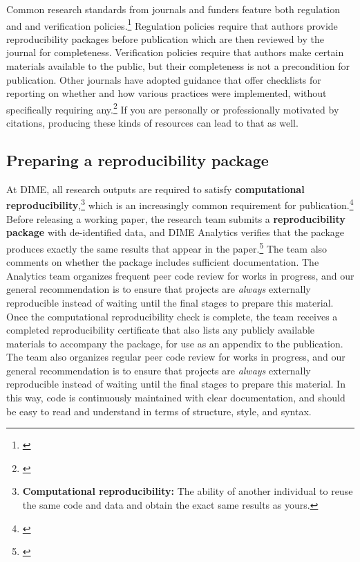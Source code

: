 \documentclass[]{tufte-book}
\begin{document}
Common research standards from journals and funders feature both
regulation and and verification policies.\footnote{\cite{@stodden2013toward}}
Regulation policies require that authors provide reproducibility
packages before publication which are then reviewed by the journal for
completeness. Verification policies require that authors make certain
materials available to the public, but their completeness is not a
precondition for publication. Other journals have adopted guidance that
offer checklists for reporting on whether and how various practices were
implemented, without specifically requiring any.\footnote{\cite{@nosek2015promoting}}
If you are personally or professionally motivated by citations,
producing these kinds of resources can lead to that as well.

\hypertarget{preparing-a-reproducibility-package}{%
\subsection*{Preparing a reproducibility
package}\label{preparing-a-reproducibility-package}}

At DIME, all research outputs are required to satisfy
\textbf{computational reproducibility},\footnote{\textbf{Computational
  reproducibility:} The ability of another individual to reuse the same
  code and data and obtain the exact same results as yours.}
which is an increasingly common requirement for publication.\footnote{\href{https://dimewiki.worldbank.org/Reproducible_Research}{}}
Before releasing a working paper, the research team submits a
\textbf{reproducibility package} with de-identified
data, and DIME Analytics verifies that
the package produces exactly the same results that appear in the
paper.\footnote{\href{https://blogs.worldbank.org/impactevaluations/what-development-economists-talk-about-when-they-talk-about-reproducibility}{}}
The team also comments on whether the package includes sufficient
documentation. The Analytics team organizes frequent peer code review
for works in progress, and our general recommendation
is to ensure that projects are \emph{always} externally reproducible
instead of waiting until the final stages to prepare this material. Once
the computational reproducibility check is complete, the team receives a
completed reproducibility certificate that also lists any publicly
available materials to accompany the package, for use as an appendix to
the publication. The team also organizes regular peer code review for
works in progress, and our general recommendation is to ensure that
projects are \emph{always} externally reproducible instead of waiting
until the final stages to prepare this material. In this way, code is
continuously maintained with clear documentation, and should be easy to
read and understand in terms of structure, style, and syntax.
\end{document}
